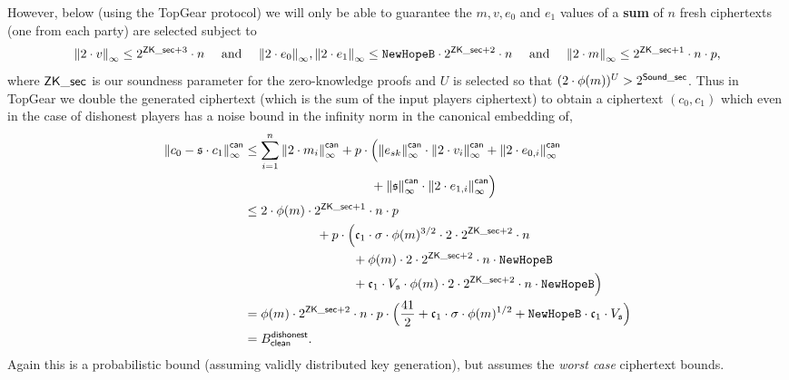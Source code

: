 \noindent
However, below (using the TopGear protocol)
we will only be able to guarantee the $m, v, e_0$ and $e_1$ 
values of a {\bf sum} of $n$ fresh ciphertexts
(one from each party) are selected subject to
\[ {\Vert 2 \cdot v \Vert}_\infty \le 2^{\mathsf{ZK\_sec} + 3} \cdot n \quad 
    \mbox{  and  } \quad
   {\Vert 2 \cdot e_0 \Vert}_\infty, {\Vert 2 \cdot e_1 \Vert}_\infty \le \texttt{NewHopeB} \cdot 2^{\mathsf{ZK\_sec} + 2} \cdot n \quad
    \mbox{  and  } \quad
   {\Vert 2 \cdot m \Vert}_\infty \le 2^{\mathsf{ZK\_sec} + 1} \cdot n \cdot p,
\]
where $\mathsf{ZK\_sec}$ is our soundness parameter for the 
zero-knowledge proofs and $U$ is selected so that 
$(2 \cdot \phi(m))^U > 2^{\mathsf{Sound\_sec}}$.
Thus in TopGear we double the generated ciphertext 
(which is the sum of the input players ciphertext)
to obtain a ciphertext $(c_0,c_1)$ which even in the
case of dishonest players has a noise bound in the
infinity norm in the canonical embedding of,
\begin{align*}
  \norm{c_0 - \sk \cdot c_1}_\infty^\can
  &\le \sum_{i=1}^n
  	\norm{2 \cdot m_i}_\infty^\can
	+ p \cdot \Big(\norm{e_{sk}}_\infty^\can \cdot \norm{2 \cdot v_i}_\infty^\can 
	+ \norm{2 \cdot e_{0,i}}_\infty^\can \\
  &\hspace{3.5cm}
	+ \norm{\sk}_\infty^\can \cdot \norm{2 \cdot e_{1,i}}_\infty^\can \Big) \\
   &\le 2 \cdot \phi(m) \cdot 2^{\ZKsecp+1} \cdot n \cdot p  \\
   & \hspace{2cm}
	+ p \cdot \Big(
	 \gc_1 \cdot \sigma \cdot \phi(m)^{3/2} \cdot 2 \cdot 2^{\ZKsecp+2} \cdot n\\
  &\hspace{3cm}
	  + \phi(m) \cdot 2 \cdot  2^{\ZKsecp+2} \cdot n \cdot \texttt{NewHopeB}  \\
  &\hspace{3cm}
	  +  \gc_1 \cdot V_\sk \cdot \phi(m) \cdot 2 \cdot 2^{\ZKsecp+2} \cdot n \cdot \texttt{NewHopeB} 
	\Big)  \\
  &=\phi(m) \cdot 2^{\ZKsecp+2} \cdot n \cdot p
	\cdot \Big( \frac{41}{2} + \gc_1 \cdot \sigma \cdot \phi(m)^{1/2}  
	           +  \texttt{NewHopeB} \cdot \gc_1 \cdot V_\sk
	\Big)   \\
  & = B_\clean^\dishonest.
\end{align*}
Again this is a probabilistic bound (assuming validly
distributed key generation), but assumes the {\em worst case}
ciphertext bounds.

